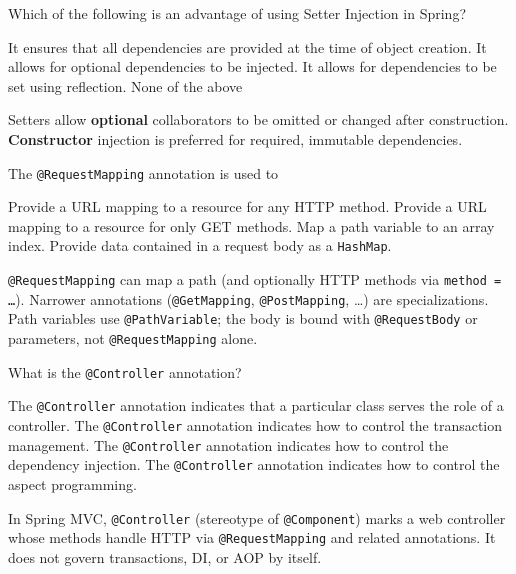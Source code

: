 \question[4]
Which of the following is an advantage of using Setter Injection in Spring?
\begin{choices}
  \choice It ensures that all dependencies are provided at the time of object creation.
  \CorrectChoice It allows for optional dependencies to be injected.
  \choice It allows for dependencies to be set using reflection.
  \choice None of the above
\end{choices}
\begin{solution}
  Setters allow \textbf{optional} collaborators to be omitted or changed after construction. \textbf{Constructor} injection is preferred for required, immutable dependencies.
\end{solution}

\question[4]
The \texttt{@RequestMapping} annotation is used to
\begin{choices}
  \CorrectChoice Provide a URL mapping to a resource for any HTTP method.
  \choice Provide a URL mapping to a resource for only GET methods.
  \choice Map a path variable to an array index.
  \choice Provide data contained in a request body as a \texttt{HashMap}.
\end{choices}
\begin{solution}
  \texttt{@RequestMapping} can map a path (and optionally HTTP methods via \texttt{method = \ldots}). Narrower annotations (\texttt{@GetMapping}, \texttt{@PostMapping}, \ldots) are specializations. Path variables use \texttt{@PathVariable}; the body is bound with \texttt{@RequestBody} or parameters, not \texttt{@RequestMapping} alone.
\end{solution}

\question[4]
What is the \texttt{@Controller} annotation?
\begin{choices}
  \CorrectChoice The \texttt{@Controller} annotation indicates that a particular class serves the role of a controller.
  \choice The \texttt{@Controller} annotation indicates how to control the transaction management.
  \choice The \texttt{@Controller} annotation indicates how to control the dependency injection.
  \choice The \texttt{@Controller} annotation indicates how to control the aspect programming.
\end{choices}
\begin{solution}
  In Spring MVC, \texttt{@Controller} (stereotype of \texttt{@Component}) marks a web controller whose methods handle HTTP via \texttt{@RequestMapping} and related annotations. It does not govern transactions, DI, or AOP by itself.
\end{solution}

